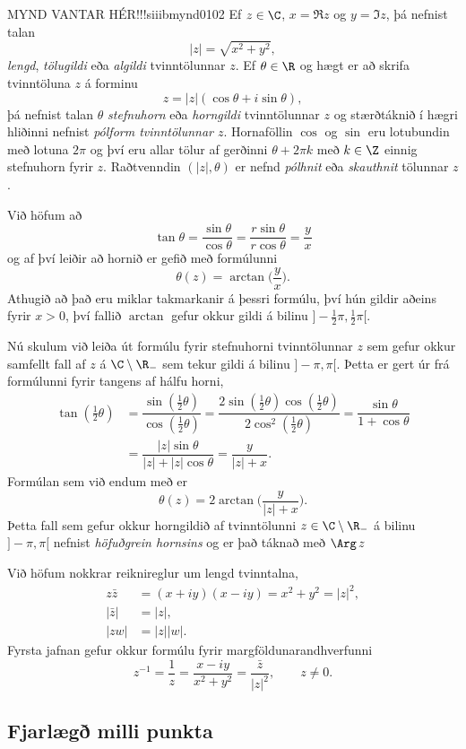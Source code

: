 MYND VANTAR HÉR!!!{siiibmynd0102}{}  
Ef $z\in \C$, $x=\Re z$ og $y=\Im z$, þá nefnist talan
$$
|z|=\sqrt{x^ 2+y^2},
$$
{\it lengd}, {\it tölugildi } eða {\it algildi } tvinntölunnar
$z$.  
Ef $\theta\in \R$ og hægt er að skrifa tvinntöluna $z$ 
á forminu $$
z=|z|(\cos \theta +i\sin \theta),
$$
þá nefnist talan $\theta$ {\it stefnuhorn} eða 
{\it horngildi } tvinntölunnar $z$ og stærðtáknið í hægri hliðinni
nefnist {\it pólform tvinntölunnar $z$}.
Hornaföllin $\cos$ og $\sin$ eru lotubundin með lotuna 
$2\pi$ og því eru allar tölur af gerðinni $\theta+2\pi k$
með $k\in \Z$ einnig stefnuhorn fyrir $z$.  
Raðtvenndin $(|z|,\theta)$ er nefnd {\it pólhnit}
eða {\it skauthnit} tölunnar $z$.

Við höfum að $$
\tan \theta=\dfrac{\sin\theta}{\cos\theta}
=\dfrac{r\sin\theta}{r\cos\theta}=\dfrac yx
$$
og af því leiðir að hornið er gefið með formúlunni
$$
\theta(z)=\arctan\bigg(\dfrac yx\bigg).
$$
Athugið að það eru miklar takmarkanir á þessri formúlu, því hún gildir
aðeins fyrir $x>0$, því fallið $\arctan$ gefur okkur gildi á bilinu
$]-\tfrac 12 \pi,\tfrac 12 \pi[$.  

Nú skulum við leiða út formúlu fyrir stefnuhorni tvinntölunnar 
$z$ sem gefur okkur samfellt fall af $z$ á $\C\setminus \R_-$ sem
tekur gildi á bilinu $]-\pi,\pi[$. Þetta er gert úr frá formúlunni
fyrir tangens af hálfu horni,
\begin{align*}
\tan(\tfrac 12\theta)&=\dfrac{\sin(\tfrac 12\theta)}{\cos(\tfrac
12\theta)} = \dfrac{2\sin(\tfrac 12\theta)\cos(\tfrac 12\theta)}
{2\cos^2(\tfrac 12\theta)}=\dfrac{\sin \theta}{1+\cos\theta}  \\
&=\dfrac{|z|\sin \theta}{|z|+|z|\cos\theta}=\dfrac y{|z|+x}.
\end{align*}
Formúlan sem við endum með er
$$
\theta(z)=2\arctan\bigg(\dfrac y{|z|+x}\bigg).
$$
Þetta fall sem gefur okkur horngildið af tvinntölunni
$z\in \C\setminus \R_-$  á bilinu $]-\pi,\pi[$
nefnist {\it höfuðgrein hornsins} og er það táknað með
$\Arg \, z$

Við höfum nokkrar reiknireglur um lengd tvinntalna,
\begin{align*}
  z\bar z&=(x+iy)(x-iy)=x^2+y^2=|z|^2,\\
|\bar z|&=|z|,\\
|zw|&=|z||w|.
\end{align*}
Fyrsta jafnan  gefur okkur 
formúlu fyrir margföldunarandhverfunni
$$
z^{-1}=\dfrac 1z=\dfrac{x-iy}{x^2+y^2}=\dfrac{\bar z}{|z|^2}, \qquad z\neq 0.
$$

\subsection*{Fjarlægð milli punkta}

